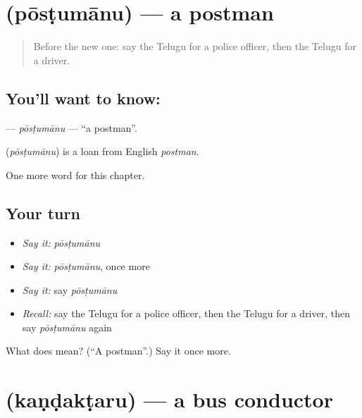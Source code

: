 \section[\texorpdfstring{\te{పోస్టుమాను} (pōsṭumānu)}{పోస్టుమాను (pōsṭumānu)}]{ (pōsṭumānu) — a postman}

\label{lesson:TE-C237-postumanu}



\begin{quote}
Before the new one: say the Telugu for a police officer, then the Telugu for a driver.
\end{quote}

\subsection*{You'll want to know: }
\textbf{} — \emph{pōsṭumānu} — \textquotedblleft{}a postman\textquotedblright{}.

\begin{cousinweb}
\textbf{} (\emph{pōsṭumānu}) is a loan from English \emph{postman}.
\end{cousinweb}

\begin{grammarlens}[title={What you've built}]
One more word for this chapter.
\end{grammarlens}

\subsection*{Your turn}
\begin{itemize}
\raggedright
  \item \emph{Say it:} \emph{pōsṭumānu}
  \item \emph{Say it:} \emph{pōsṭumānu}, once more
  \item \emph{Say it:} say \emph{pōsṭumānu}
  \item \emph{Recall:} say the Telugu for a police officer, then the Telugu for a driver, then say \emph{pōsṭumānu} again
\end{itemize}

\begin{tcolorbox}[breakable,colback=teal!4,colframe=teal!35!black,title={Before you move on}]
What does  mean? (\textquotedblleft{}A postman\textquotedblright{}.) Say it once more.
\end{tcolorbox}
\section[\texorpdfstring{\te{కండక్టరు} (kaṇḍakṭaru)}{కండక్టరు (kaṇḍakṭaru)}]{ (kaṇḍakṭaru) — a bus conductor}

